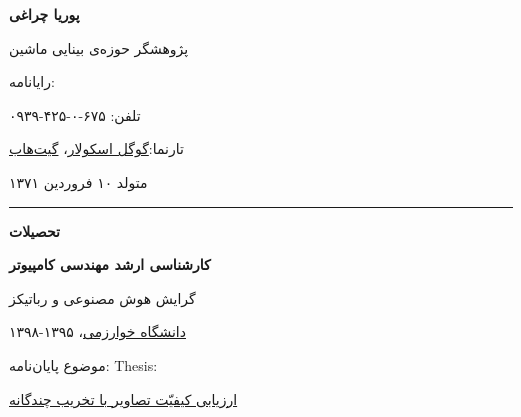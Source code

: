 \documentclass{letter}
\begin{document}
\begin{large}
\textbf{{\nastaliq پوریا چراغی}} \hskip 10.2cm  \textbf{}

	{\nastaliq پژوهشگر حوزه‌ی بینایی ماشین} \hskip 4.9cm  \textbf{}
\end{large}
\vskip 0.02cm
رایانامه:  \hskip 8cm 

تلفن: ۶۷۵-۰-۴۲۵-۰۹۳۹ \hskip 10.5cm 

تارنما:\href{https://scholar.google.com/citations?user=ebSTTkAAAAAJ&hl=en&oi=ao}{گوگل اسکولار}، \href{https://github.com/cheraaqee}{گیت‌هاب} \hskip 8.5cm 

متولد ۱۰ فروردین ۱۳۷۱ \hskip 11cm 

\noindent \rule{18cm}{3pt}

\begin{Large}
	\textbf{تحصیلات}\hskip 13.5cm 
\end{Large}

\textbf{کارشناسی ارشد مهندسی کامپیوتر}\hskip 9.7cm 

گرایش هوش مصنوعی و رباتیکز \hskip 9cm {}

\href{https://khu.ac.ir}{دانشگاه خوارزمی}، ۱۳۹۵-۱۳۹۸ \hskip 9cm 

موضوع پایان‌نامه:\hskip 15cm Thesis:

\href{https://ganj.irandoc.ac.ir/#/articles/815c4b4b589480a070f023280771c679}{ارزیابی کیفیّت تصاویر با تخریب چندگانه} \hskip 1cm \emph{}
\end{document}
